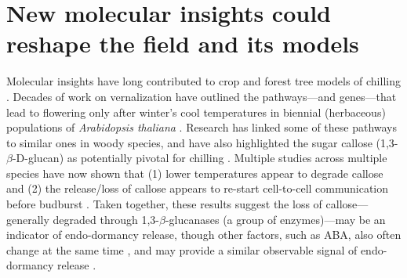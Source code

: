 \documentclass[11pt]{article}
\begin{document}
\section*{New molecular insights could reshape the field and its models} 

Molecular insights have long contributed to crop and forest tree models of chilling \citep{chuinearees}. Decades of work on vernalization have outlined the pathways---and genes---that lead to flowering only after winter's cool temperatures in biennial (herbaceous) populations of \emph{Arabidopsis thaliana} \citep[Fig. \ref{fig:modelsketch},][]{Wilczek:2009oa,kim2009vernalization}. Research has linked some of these pathways to similar ones in woody species, and have also highlighted the sugar callose (1,3-$\beta$-{\sc D}-glucan) as potentially pivotal for chilling \citep{vanderschoot2014,pan2021aba}. Multiple studies across multiple species have now shown that (1) lower temperatures appear to degrade callose and (2) the release/loss of callose appears to re-start cell-to-cell communication before budburst \citep{vanderschoot2014}. Taken together, these results suggest the loss of callose---generally degraded through 1,3-$\beta$-glucanases (a group of enzymes)---may be an indicator of endo-dormancy release, though other factors, such as  ABA, also often change at the same time \citep[][]{tylewicz2018photoperiodic,pan2021aba}, and may provide a similar observable signal of endo-dormancy release \citep{rinne2018,andre2022populus}. 

\end{document}
